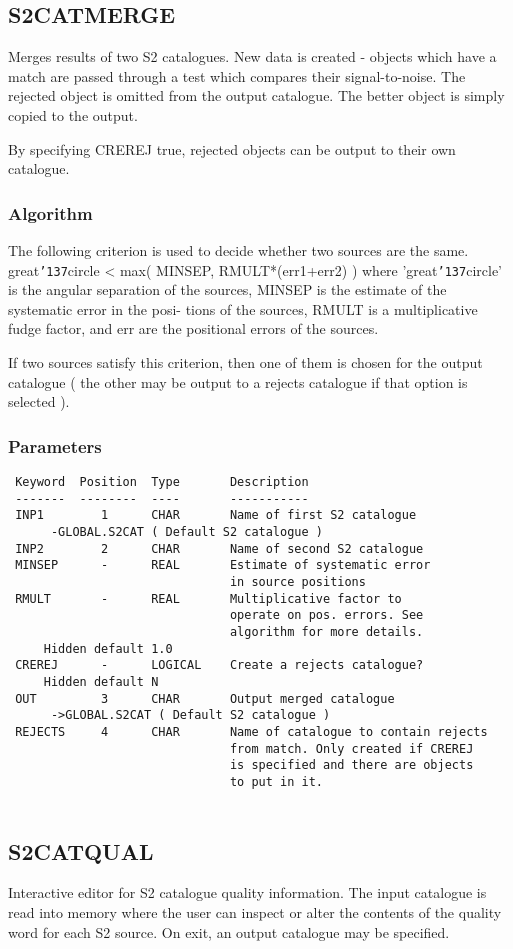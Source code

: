 \documentclass{book}
\renewcommand{\_}{{\tt\char'137}}     %
\begin{document}
\subsection{S2CATMERGE}
Merges results of two S2 catalogues. New data is created -
objects which have a match are passed through a test which
compares their signal-to-noise. The rejected object is
omitted from the output catalogue. The better object is
simply copied to the output.
 
By specifying CREREJ true, rejected objects can be output
to their own catalogue.
 
\subsubsection{Algorithm}
The following criterion is used to decide whether two sources
are the same.
great\_circle < max( MINSEP, RMULT*(err1+err2) )
where 'great\_circle' is the angular separation of the sources,
MINSEP is the estimate of the systematic error in the posi-
tions of the sources, RMULT is a multiplicative fudge factor,
and err are the positional errors of the sources.
 
If two sources satisfy this criterion, then one of them is
chosen for the output catalogue ( the other may be output
to a rejects catalogue if that option is selected ).
 
\subsubsection{Parameters}
\begin{verbatim}
 Keyword  Position  Type       Description
 -------  --------  ----       -----------
 INP1        1      CHAR       Name of first S2 catalogue
      -GLOBAL.S2CAT ( Default S2 catalogue )
 INP2        2      CHAR       Name of second S2 catalogue
 MINSEP      -      REAL       Estimate of systematic error
                               in source positions
 RMULT       -      REAL       Multiplicative factor to
                               operate on pos. errors. See
                               algorithm for more details.
     Hidden default 1.0
 CREREJ      -      LOGICAL    Create a rejects catalogue?
     Hidden default N
 OUT         3      CHAR       Output merged catalogue
      ->GLOBAL.S2CAT ( Default S2 catalogue )
 REJECTS     4      CHAR       Name of catalogue to contain rejects
                               from match. Only created if CREREJ
                               is specified and there are objects
                               to put in it.
 
\end{verbatim}\subsection{S2CATQUAL}
Interactive editor for S2 catalogue quality information. The input
catalogue is read into memory where the user can inspect or alter
the contents of the quality word for each S2 source. On exit, an
output catalogue may be specified.
 
\end{document}
